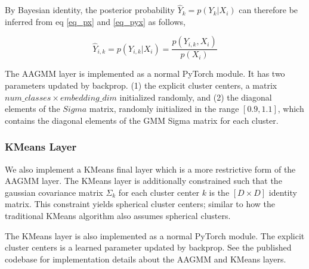\documentclass[10pt,twocolumn,letterpaper]{article}
\begin{document}
By Bayesian identity, the posterior probability $\hat{Y}_k=p(Y_{k}|X_i)$ can therefore be inferred from eq \ref{eq_px} and \ref{eq_pyx} as follows,

\begin{equation}
	\hat{Y}_{i,k} = p(Y_{i,k}|X_i) = \frac{p(Y_{i,k}, X_i)}{p(X_i)}
\end{equation}

The AAGMM layer is implemented as a normal PyTorch \cite{pytorch} module.
It has two parameters updated by backprop.
(1) the explicit cluster centers, a matrix $num\_classes \times embedding\_dim$ initialized randomly, and
(2) the diagonal elements of the $Sigma$ matrix, randomly initialized in the range $[0.9, 1.1]$, which contains the diagonal elements of the GMM Sigma matrix for each cluster.

\subsubsection{KMeans Layer}

We also implement a KMeans final layer which is a more restrictive form of the AAGMM layer.
The KMeans layer is additionally constrained such that the gaussian covariance matrix $\Sigma_k$ for each cluster center $k$ is the $[D \times D]$ identity matrix. 
This constraint yields spherical cluster centers; similar to how the traditional KMeans algorithm also assumes spherical clusters.


The KMeans layer is also implemented as a normal PyTorch \cite{pytorch} module.
The explicit cluster centers is a learned parameter updated by backprop.
See the published codebase for implementation details about the AAGMM and KMeans layers.
\end{document}
